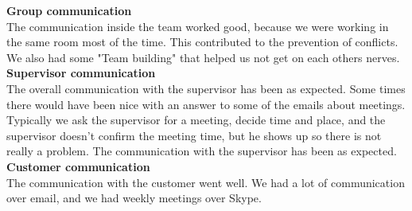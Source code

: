 
\indent \indent \textbf{Group communication} \\
The communication inside the team worked good, because we were working in the same room most of the time. This contributed to the prevention of conflicts. We also had some "Team building" that helped us not get on each others nerves. 
\\

\textbf{Supervisor communication} \\
The overall communication with the supervisor has been as expected. Some times there would have been nice with an answer to some of the emails about meetings. Typically we ask the supervisor for a meeting, decide time and place, and the supervisor doesn't confirm the meeting time, but he shows up so there is not really a problem. 
The communication with the supervisor has been as expected. 
\\ 

\textbf{Customer communication} \\
The communication with the customer went well. We had a lot of communication over email, and we had weekly meetings over Skype. 
\\

